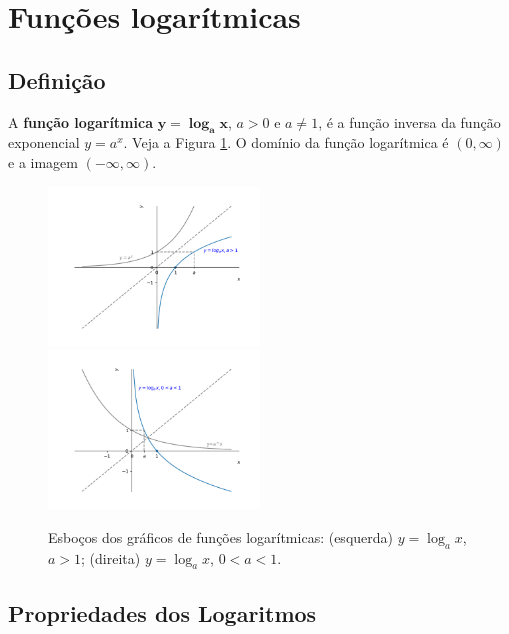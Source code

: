 \documentclass[../main.tex]{subfiles}
\begin{document}
\section{Funções logarítmicas}\label{sec:logaritmo}
\subsection{Definição}
A {\bf função logarítmica} $\boldsymbol{y = \log_a x}$, $a>0$ e $a\neq 1$, é a função inversa da função exponencial $y = a^x$. Veja a Figura \ref{fig:log_graficos}. O domínio da função logarítmica é $(0,\infty)$ e a imagem $(-\infty, \infty)$.

\begin{figure}[hbt]
  \centering
  \includegraphics[width=0.5\textwidth]{fig_func/fig_log_2}~
  \includegraphics[width=0.5\textwidth]{fig_func/fig_log_12}
  \caption{Esboços dos gráficos de funções logarítmicas: (esquerda) $y = \log_a x$, $a>1$; (direita) $y = \log_a x$, $0<a<1$.}
  \label{fig:log_graficos}
\end{figure}

\newpage
\subsection{Propriedades dos Logaritmos}
\end{document}
